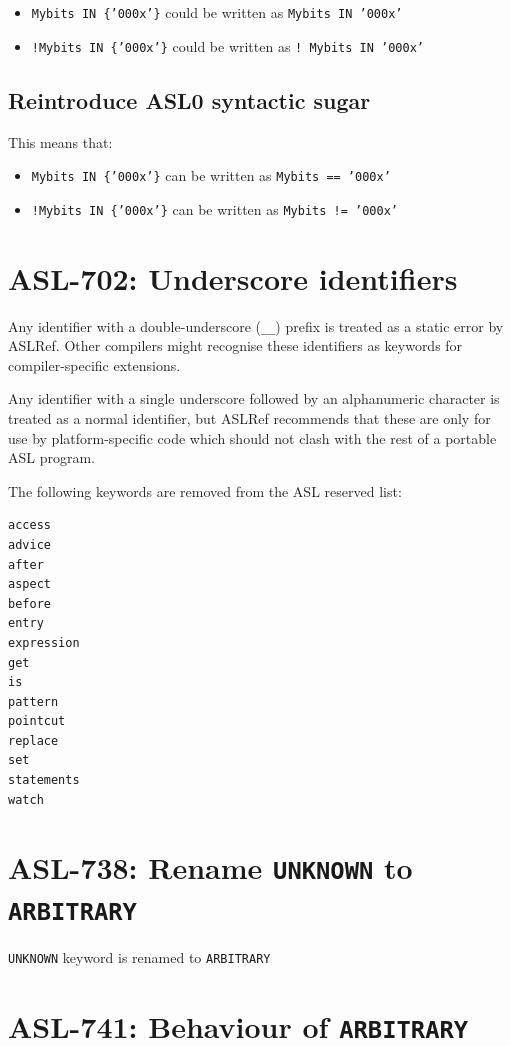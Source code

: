 \begin{itemize}
\item \texttt{Mybits IN \{'000x'\}} could be written as \texttt{Mybits IN '000x'}
\item \texttt{!Mybits IN \{'000x'\}} could be written as \texttt{! Mybits
IN '000x'}
\end{itemize}

\subsection{Reintroduce ASL0 syntactic sugar} 

This means that:
\begin{itemize}
\item \texttt{Mybits IN \{'000x'\}} can be written as \texttt{Mybits == '000x'}
\item \texttt{!Mybits IN \{'000x'\}} can be written as \texttt{Mybits != '000x'}
\end{itemize}

\section{ASL-702: Underscore identifiers}

Any identifier with a double-underscore (\texttt{\_\_}) prefix is
treated as a static error by ASLRef. Other compilers might recognise
these identifiers as keywords for compiler-specific extensions.

Any identifier with a single underscore followed by an alphanumeric
character is treated as a normal identifier, but ASLRef recommends that
these are only for use by platform-specific code which should not clash
with the rest of a portable ASL program.

The following keywords are removed from the ASL reserved list: 
\begin{verbatim}
access
advice
after
aspect
before
entry
expression
get
is
pattern
pointcut
replace
set
statements
watch
\end{verbatim}

\section{ASL-738: Rename \texttt{UNKNOWN} to \texttt{ARBITRARY}}

\texttt{UNKNOWN} keyword is renamed to \texttt{ARBITRARY}

\section{ASL-741: Behaviour of \texttt{ARBITRARY}}

